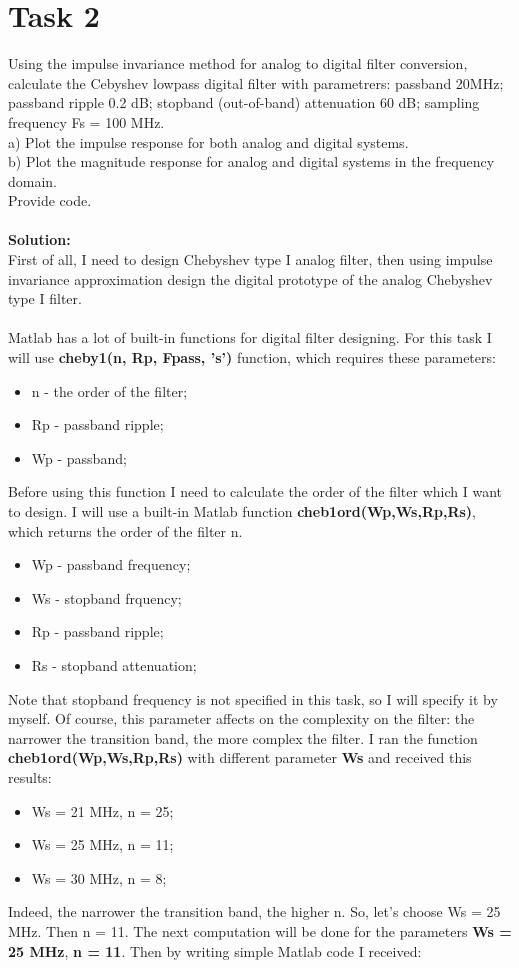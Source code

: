 \documentclass[16pt]{report}
\begin{document}
\section*{Task 2}
Using the impulse invariance method for analog to digital filter conversion, calculate the Cebyshev lowpass digital filter with parametrers: passband 20MHz; passband ripple 0.2 dB; stopband (out-of-band) attenuation 60 dB; sampling frequency Fs = 100 MHz.\\
a) Plot the impulse response for both analog and digital systems. \\
b) Plot the magnitude response for analog and digital systems in the frequency domain. \\
Provide code. \\ \\
\textbf{Solution:} \\
First of all, I need to design Chebyshev type I analog filter, then using impulse invariance approximation design the digital prototype of the analog Chebyshev type I filter. \\ \\
Matlab has a lot of built-in functions for digital filter designing. For this task I will use \textbf{cheby1(n, Rp, Fpass, 's')} function, which requires these parameters: \\
\begin{itemize}
    \item n - the order of the filter;
    \item Rp - passband ripple;
    \item Wp - passband;
\end{itemize}
Before using this function I need to calculate the order of the filter which I want to design. I will use a built-in Matlab function \textbf{cheb1ord(Wp,Ws,Rp,Rs)}, which returns the order of the filter n.
\begin{itemize}
    \item Wp - passband frequency;
    \item Ws - stopband frquency;
    \item Rp - passband ripple;
    \item Rs - stopband attenuation;
\end{itemize}
Note that stopband frequency is not specified in this task, so I will specify it by myself. Of course, this parameter affects on the complexity on the filter: the narrower the transition band, the more complex the filter. I ran the function \textbf{cheb1ord(Wp,Ws,Rp,Rs)} with different parameter \textbf{Ws} and received this results: 
\begin{itemize}
    \item Ws = 21 MHz, n = 25;
    \item Ws = 25 MHz, n = 11;
    \item Ws = 30 MHz, n = 8;
\end{itemize}
Indeed, the narrower the transition band, the higher n. So, let's choose Ws = 25 MHz. Then n = 11. The next computation will be done for the parameters \textbf{Ws = 25 MHz}, \textbf{n = 11}. Then by writing simple Matlab code I received:
\end{document}
